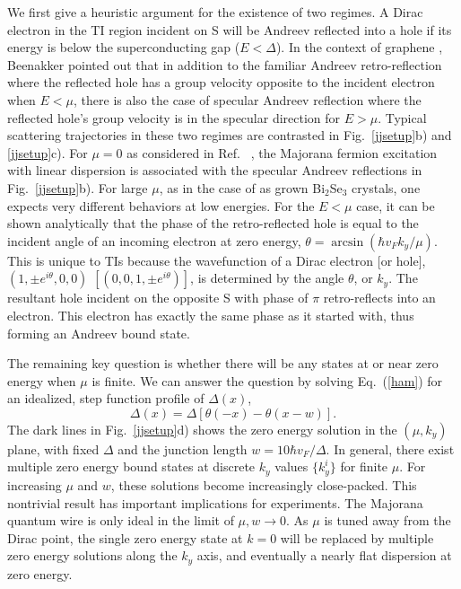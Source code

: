 We first give a heuristic argument for the existence of two regimes.
A Dirac electron in the TI region incident on S will be Andreev reflected into a hole if its energy is below the superconducting gap ($E<\Delta$). 
In the context of graphene \cite{PhysRevLett.97.067007,RevModPhys.80.1337}, 
Beenakker pointed out that in addition to the familiar Andreev retro-reflection where the reflected hole has a group velocity opposite to the incident electron when $E<\mu$, 
there is also the case of specular Andreev reflection where the reflected hole's group velocity is in the specular direction for $E>\mu$. Typical scattering trajectories in these two regimes are contrasted in Fig.~\ref{jjsetup}b) and \ref{jjsetup}c).
For $\mu=0$ as considered in Ref.~ \cite{fu_superconducting_2008}, 
the Majorana fermion excitation with linear dispersion is associated with the specular Andreev reflections in Fig.~\ref{jjsetup}b). 
For large $\mu$, as in the case of as grown Bi$_2$Se$_3$ crystals, one expects very different behaviors at low energies. 
For the $E<\mu$ case, it can be shown analytically that the phase of the retro-reflected hole is equal to the incident angle of an incoming electron at zero energy, $\theta=\arcsin(\hbar v_F k_y/\mu)$. This is unique to TIs because the wavefunction of a Dirac electron [or hole], $(1,\pm e^{i\theta},0,0)$ $[(0,0,1,\pm e^{i\theta})]$, 
is determined by the angle $\theta$, or $k_y$. The resultant hole incident on the opposite S with phase of $\pi$ retro-reflects into an electron. This electron has exactly the same phase as it started with, thus forming an Andreev bound state. 


The remaining key question is whether there will be any states at or near 
zero energy when $\mu$ is finite. We can answer the question by solving 
Eq.~(\ref{ham}) for an idealized, step function profile of $\Delta(x)$,
\begin{equation}
\Delta(x) = \Delta[\theta(-x)-\theta(x-w)].
\end{equation}
The dark lines in Fig.~\ref{jjsetup}d) shows the zero energy solution in the 
$(\mu,k_y)$ plane, with fixed $\Delta$ and the junction length $w=10\hbar v_F/\Delta$. 
In general, there exist multiple zero energy bound states
at discrete $k_y$ values $\{k_y^i\}$ for finite $\mu$. 
For increasing $\mu$ and  $w$,
these solutions become increasingly close-packed.
This nontrivial result has important implications for experiments. 
The Majorana quantum wire is only ideal in the limit of $\mu,w\rightarrow 0$.
As $\mu$ is tuned away from the Dirac point, the single zero energy state at $k=0$ will 
be replaced by multiple zero energy solutions
along the $k_y$ axis, and eventually a nearly flat dispersion at zero energy.


